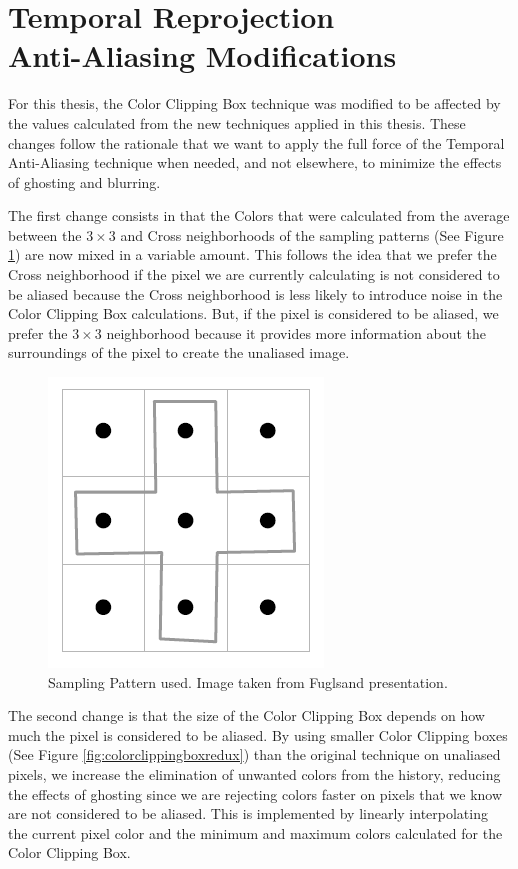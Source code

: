 \documentclass{cslthse-msc}
\begin{document}
\section[Temporal Reprojection Anti-Aliasing Modifications]{Temporal Reprojection \\ Anti-Aliasing Modifications}
For this thesis, the Color Clipping Box technique was modified to be affected by the values calculated from the new techniques applied in this thesis. These changes follow the rationale that we want to apply the full force of the Temporal Anti-Aliasing technique when needed, and not elsewhere, to minimize the effects of ghosting and blurring.

The first change consists in that the Colors that were calculated from the average between the $3\times 3$ and Cross neighborhoods of the sampling patterns (See Figure \ref{fig:samplingpattern_2}) are now mixed in a variable amount. This follows the idea that we prefer the Cross neighborhood if the pixel we are currently calculating is not considered to be aliased because the Cross neighborhood is less likely to introduce noise in the Color Clipping Box calculations. But, if the pixel is considered to be aliased, we prefer the $3\times 3$ neighborhood because it provides more information about the surroundings of the pixel to create the unaliased image.  

\begin{figure}[!hbt]
	\centering
	\includegraphics[scale=0.3]{images/sampling_pattern.png}
	\caption{Sampling Pattern used. Image taken from Fuglsand presentation. \protect\cite{Fuglsand2016}}\label{fig:samplingpattern_2}
\end{figure}

The second change is that the size of the Color Clipping Box depends on how much the pixel is considered to be aliased. By using smaller Color Clipping boxes (See Figure \ref{fig:colorclippingboxredux}) than the original technique on unaliased pixels, we increase the elimination of unwanted colors from the history, reducing the effects of ghosting since we are rejecting colors faster on pixels that we know are not considered to be aliased. This is implemented by linearly interpolating the current pixel color and the minimum and maximum colors calculated for the Color Clipping Box.
\end{document}
